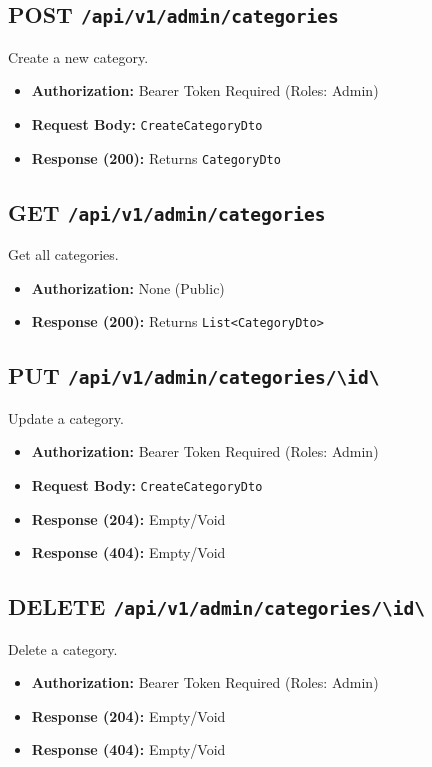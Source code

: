 \subsection{POST \texttt{/api/v1/admin/categories}}
Create a new category.
\begin{itemize}
    \item \textbf{Authorization:} Bearer Token Required (Roles: Admin)
    \item \textbf{Request Body:} \texttt{CreateCategoryDto}
    \item \textbf{Response (200):} Returns \texttt{CategoryDto}
\end{itemize}

\subsection{GET \texttt{/api/v1/admin/categories}}
Get all categories.
\begin{itemize}
    \item \textbf{Authorization:} None (Public)
    \item \textbf{Response (200):} Returns \texttt{List<CategoryDto>}
\end{itemize}

\subsection{PUT \texttt{/api/v1/admin/categories/\textbackslash{}{id\textbackslash{}}}}
Update a category.
\begin{itemize}
    \item \textbf{Authorization:} Bearer Token Required (Roles: Admin)
    \item \textbf{Request Body:} \texttt{CreateCategoryDto}
    \item \textbf{Response (204):} Empty/Void
    \item \textbf{Response (404):} Empty/Void
\end{itemize}

\subsection{DELETE \texttt{/api/v1/admin/categories/\textbackslash{}{id\textbackslash{}}}}
Delete a category.
\begin{itemize}
    \item \textbf{Authorization:} Bearer Token Required (Roles: Admin)
    \item \textbf{Response (204):} Empty/Void
    \item \textbf{Response (404):} Empty/Void
\end{itemize}

